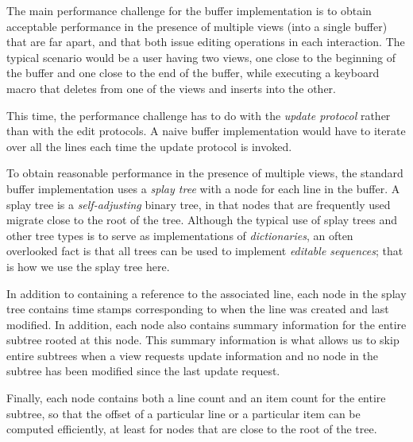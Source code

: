 The main performance challenge for the buffer implementation is to
obtain acceptable performance in the presence of multiple views (into
a single buffer) that are far apart, and that both issue editing
operations in each interaction.  The typical scenario would be a user
having two views, one close to the beginning of the buffer and one
close to the end of the buffer, while executing a keyboard macro that
deletes from one of the views and inserts into the other.

This time, the performance challenge has to do with the \emph{update
  protocol} rather than with the edit protocols.  A naive buffer
implementation would have to iterate over all the lines each time the
update protocol is invoked.

To obtain reasonable performance in the presence of multiple views,
the standard buffer implementation uses a \emph{splay tree}
\cite{Sleator:1985:SBS:3828.3835} with a node for each line in the
buffer.  A splay tree is a \emph{self-adjusting} binary tree, in that
nodes that are frequently used migrate close to the root of the tree.
Although the typical use of splay trees and other tree types is to
serve as implementations of \emph{dictionaries}, an often overlooked
fact is that all trees can be used to implement \emph{editable
  sequences}; that is how we use the splay tree here.

In addition to containing a reference to the associated line, each
node in the splay tree contains time stamps corresponding to when the
line was created and last modified.  In addition, each node also
contains summary information for the entire subtree rooted at this
node.  This summary information is what allows us to skip entire
subtrees when a view requests update information and no node in the
subtree has been modified since the last update request.

Finally, each node contains both a line count and an item count for
the entire subtree, so that the offset of a particular line or a
particular item can be computed efficiently, at least for nodes that
are close to the root of the tree.
